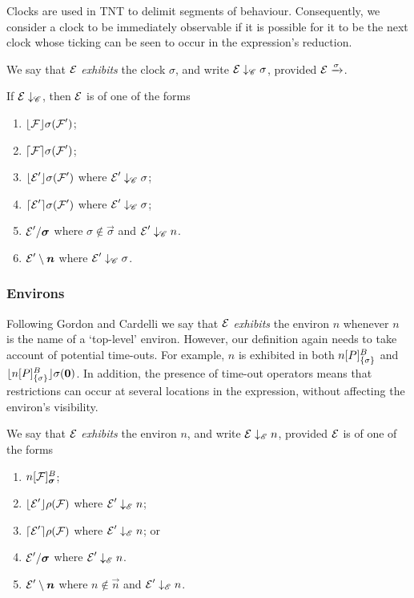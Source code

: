 \documentclass[orivec]{llncs}
\newcommand{\Exhibits}[1]{\mathrel{\downarrow_{#1}}}
\newcommand{\ExhibitsC}{\Exhibits{\mathscr{C}}}
\newcommand{\ExhibitsE}{\Exhibits{\mathscr{E}}}
\newcommand{\Does}[1]{\xderives{#1}}
\begin{document}
Clocks are used in TNT to delimit segments of behaviour. Consequently, we
consider a clock to be immediately observable if it is possible for it to be the
next clock whose ticking can be seen to occur in the expression's reduction.

\begin{definition}
We say that $\text{$\mathcal{E}$}$ \emph{exhibits} the clock $\sigma$, and write $\expr \ExhibitsC \sigma$, provided $\expr \Does{\sigma}$.
\end{definition}

\begin{proposition}
If $\expr \ExhibitsC$, then $\text{$\mathcal{E}$}$ is of one of the forms
\begin{enumerate}
\item
    $\lfloor{\text{$\mathcal{F}$}}\rfloor {\sigma} ({\text{$\mathcal{F}$}'})$;
\item
    $\lceil{\text{$\mathcal{F}$}}\rceil {\sigma} ({\text{$\mathcal{F}$}'})$;
\item
    $\lfloor{\text{$\mathcal{E}$}'}\rfloor {\sigma} ({\text{$\mathcal{F}$}'})$ where $\expr' \ExhibitsC \sigma$;
\item
    $\lceil{\text{$\mathcal{E}$}'}\rceil {\sigma} ({\text{$\mathcal{F}$}'})$ where $\expr' \ExhibitsC \sigma$;
\item
    $\expr' \hide{\vec{\sigma}}$ where $\sigma \not\in \vec{\sigma}$ and $\expr' \ExhibitsC n$.
\item
    $\expr' \res{ \vec{n} }$ where $\expr' \ExhibitsC \sigma$.
\end{enumerate}
\end{proposition}


\subsubsection{Environs} 

Following Gordon and Cardelli \cite{GC99} we say that $\text{$\mathcal{E}$}$ \emph{exhibits}
the environ $n$ whenever $n$ is the name of a `top-level' environ. However, our
definition again needs to take account of potential time-outs. For example, $n$
is exhibited in both ${n}[ P ]^{B}_{\{\sigma\}}$ and
$\lfloor{{n}[ P ]^{B}_{\{\sigma\}}}\rfloor {\sigma} ({\textbf{0}})$. In addition, the presence of time-out operators means that restrictions can occur at several locations in the expression, without affecting the environ's visibility.

\begin{definition}
We say that $\text{$\mathcal{E}$}$ \emph{exhibits} the environ $n$, and write $\expr \ExhibitsE
n$, provided $\text{$\mathcal{E}$}$ is of one of the forms 
\begin{enumerate}
\item 
    $\locv{n}{\exprb}{B}{\vec{\sigma}}$;
\item
    $\lfloor{ \text{$\mathcal{E}$}' }\rfloor {\rho} ({\text{$\mathcal{F}$}})$ where $\expr' \ExhibitsE n$;
\item
    $\lceil{ \text{$\mathcal{E}$}' }\rceil {\rho} ({\text{$\mathcal{F}$}})$ where $\expr' \ExhibitsE n$; or
\item
    $\expr' \hide{\vec{\sigma}}$ where $\expr' \ExhibitsE n$.
\item
    $\expr' \res{ \vec{n} }$ where $n \not\in \vec{n}$ and $\expr' \ExhibitsE n$.
\end{enumerate}
\end{definition}
\end{document}
